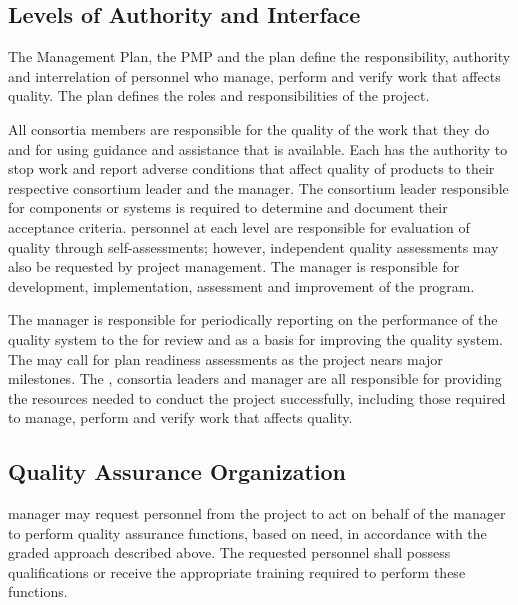 \subsection{Levels of Authority and Interface}

The  Management Plan, the  PMP
and the   plan define the
responsibility, authority and interrelation of personnel who manage,
perform and verify work that affects quality. The  plan
defines the  roles and responsibilities of the 
project.

All consortia members are responsible for the quality of the work that
they do and for using guidance and assistance that is available. Each
has the authority to stop work and report adverse conditions that
affect quality of  products to their respective
 consortium leader and the 
 manager. The consortium leader responsible for 
components or systems is required to determine and document their
acceptance criteria.  personnel at each level are
responsible for evaluation of quality through self-assessments;
however, independent quality assessments may also be requested by
project management.  The   manager is
responsible for development, implementation, assessment and
improvement of the  program.

The   manager is responsible for
periodically reporting on the performance of the quality system to the
  for review and as a basis for improving
the quality system. The   may call for
 plan readiness assessments as the project nears major
milestones. The  , consortia leaders and
  manager are all responsible for
providing the resources needed to conduct the project successfully,
including those required to manage, perform and verify work that
affects quality.

\subsection{Quality Assurance Organization}

  manager may request personnel
from the  project to act on behalf of the
  manager to perform quality
assurance functions, based on need, in accordance with the graded
approach described above. The requested personnel shall possess
qualifications or receive the appropriate training required to perform
these functions.

